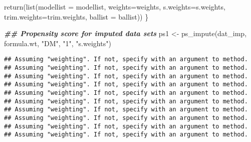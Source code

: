 \documentclass[
]{book}
\newenvironment{Shaded}{\begin{snugshade}}{\end{snugshade}}
\newcommand{\AttributeTok}[1]{\textcolor[rgb]{0.77,0.63,0.00}{#1}}
\newcommand{\ControlFlowTok}[1]{\textcolor[rgb]{0.13,0.29,0.53}{\textbf{#1}}}
\newcommand{\DocumentationTok}[1]{\textcolor[rgb]{0.56,0.35,0.01}{\textbf{\textit{#1}}}}
\newcommand{\FunctionTok}[1]{\textcolor[rgb]{0.00,0.00,0.00}{#1}}
\newcommand{\NormalTok}[1]{#1}
\newcommand{\OtherTok}[1]{\textcolor[rgb]{0.56,0.35,0.01}{#1}}
\newcommand{\SpecialCharTok}[1]{\textcolor[rgb]{0.00,0.00,0.00}{#1}}
\newcommand{\StringTok}[1]{\textcolor[rgb]{0.31,0.60,0.02}{#1}}
\begin{document}
\begin{Shaded}
\begin{Highlighting}[]
  \FunctionTok{return}\NormalTok{(}\FunctionTok{list}\NormalTok{(}\AttributeTok{modellist =}\NormalTok{ modellist, }\AttributeTok{weights=}\NormalTok{weights, }\AttributeTok{s.weights=}\NormalTok{s.weights, }\AttributeTok{trim.weights=}\NormalTok{trim.weights, }\AttributeTok{ballist =}\NormalTok{ ballist))}
\NormalTok{\}}
\end{Highlighting}
\end{Shaded}

\begin{Shaded}
\end{Shaded}

\begin{Shaded}
\begin{Highlighting}[]
\DocumentationTok{\#\# Propensity score for imputed data sets}
\NormalTok{ps1 }\OtherTok{\textless{}{-}} \FunctionTok{ps\_impute}\NormalTok{(dat\_imp, formula.wt, }\StringTok{"DM"}\NormalTok{, }\StringTok{"1"}\NormalTok{, }\StringTok{"s.weights"}\NormalTok{)}
\end{Highlighting}
\end{Shaded}

\begin{verbatim}
## Assuming "weighting". If not, specify with an argument to method.
## Assuming "weighting". If not, specify with an argument to method.
## Assuming "weighting". If not, specify with an argument to method.
## Assuming "weighting". If not, specify with an argument to method.
## Assuming "weighting". If not, specify with an argument to method.
## Assuming "weighting". If not, specify with an argument to method.
## Assuming "weighting". If not, specify with an argument to method.
## Assuming "weighting". If not, specify with an argument to method.
## Assuming "weighting". If not, specify with an argument to method.
## Assuming "weighting". If not, specify with an argument to method.
\end{verbatim}
\end{document}
